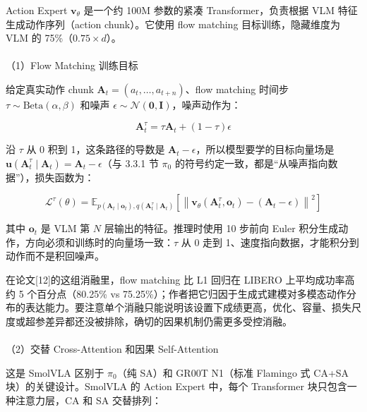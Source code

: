 \documentclass[
  chinese,
]{ctexart}
\makeatletter
\let\oldparagraph\paragraph
\renewcommand{\paragraph}{
    \@ifstar
      \xxxParagraphStar
      \xxxParagraphNoStar
  }
\newcommand{\xxxParagraphStar}[1]{\oldparagraph*{#1}\mbox{}}
\newcommand{\xxxParagraphNoStar}[1]{\oldparagraph{#1}\mbox{}}
\makeatother
\begin{document}
Action Expert \(\mathbf{v}_\theta\) 是一个约 100M 参数的紧凑
Transformer，负责根据 VLM 特征生成动作序列（action chunk）。它使用 flow
matching 目标训练，隐藏维度为 VLM 的 75\%（\(0.75 \times d\)）。

\paragraph{（1）Flow Matching
训练目标}\label{flow-matching-ux8badux7ec3ux76eeux6807}

给定真实动作 chunk \(\mathbf{A}_t = (a_t, \ldots, a_{t+n})\)、flow
matching 时间步 \(\tau \sim \text{Beta}(\alpha, \beta)\) 和噪声
\(\epsilon \sim \mathcal{N}(\mathbf{0}, \mathbf{I})\)，噪声动作为：

\[
\mathbf{A}_t^\tau = \tau \mathbf{A}_t + (1 - \tau) \epsilon
\]

沿 \(\tau\) 从 0 积到 1，这条路径的导数是
\(\mathbf{A}_t - \epsilon\)，所以模型要学的目标向量场是
\(\mathbf{u}(\mathbf{A}_t^\tau \mid \mathbf{A}_t) = \mathbf{A}_t - \epsilon\)（与
3.3.1 节 \(\pi_0\)
的符号约定一致，都是``从噪声指向数据''），损失函数为：

\[
\mathcal{L}^\tau(\theta) = \mathbb{E}_{p(\mathbf{A}_t \mid \mathbf{o}_t), q(\mathbf{A}_t^\tau \mid \mathbf{A}_t)} \left[ \left\| \mathbf{v}_\theta(\mathbf{A}_t^\tau, \mathbf{o}_t) - (\mathbf{A}_t - \epsilon) \right\|^2 \right]
\]

其中 \(\mathbf{o}_t\) 是 VLM 第 \(N\) 层输出的特征。推理时使用 10 步前向
Euler 积分生成动作，方向必须和训练时的向量场一致：\(\tau\) 从 0 走到
1、速度指向数据，才能积分到动作而不是积回噪声。

在论文{[}12{]}的这组消融里，flow matching 比 L1 回归在 LIBERO
上平均成功率高约 5 个百分点（80.25\% vs
75.25\%）；作者把它归因于生成式建模对多模态动作分布的表达能力。要注意单个消融只能说明该设置下成绩更高，优化、容量、损失尺度或超参差异都还没被排除，确切的因果机制仍需更多受控消融。

\paragraph{（2）交替 Cross-Attention 和因果
Self-Attention}\label{ux4ea4ux66ff-cross-attention-ux548cux56e0ux679c-self-attention}

这是 SmolVLA 区别于 \(\pi_0\)（纯 SA）和 GR00T N1（标准 Flamingo 式
CA+SA 块）的关键设计。SmolVLA 的 Action Expert 中，每个 Transformer
块只包含一种注意力层，CA 和 SA 交替排列：
\end{document}
